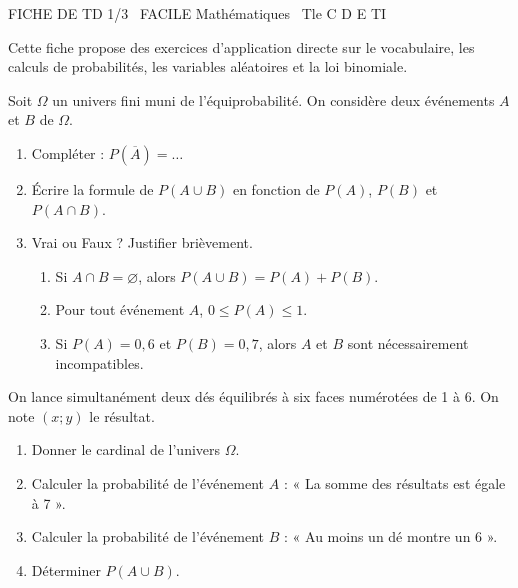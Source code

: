 \documentclass[11pt]{article}
\begin{document}
\begin{tcolorbox}[enhanced,colback=popink,colframe=popink,arc=10pt,boxrule=0pt,left=12pt,right=12pt,top=9pt,bottom=9pt]
{\color{white}\popxbold\small FICHE DE TD 1/3 \textbullet\ FACILE \hfill Mathématiques \textbullet\ Tle C D E TI\par}
\end{tcolorbox}
\vspace{4pt}
Cette fiche propose des exercices d'application directe sur le vocabulaire, les calculs de probabilités, les variables aléatoires et la loi binomiale.

\begin{exercice}
Soit $\Omega$ un univers fini muni de l'équiprobabilité. On considère deux événements $A$ et $B$ de $\Omega$.
\begin{enumerate}
    \item Compléter : $P(\overline{A}) = \dots$
    \item Écrire la formule de $P(A \cup B)$ en fonction de $P(A)$, $P(B)$ et $P(A \cap B)$.
    \item Vrai ou Faux ? Justifier brièvement.
    \begin{enumerate}
        \item Si $A \cap B = \varnothing$, alors $P(A \cup B) = P(A) + P(B)$.
        \item Pour tout événement $A$, $0 \le P(A) \le 1$.
        \item Si $P(A) = 0,6$ et $P(B) = 0,7$, alors $A$ et $B$ sont nécessairement incompatibles.
    \end{enumerate}
\end{enumerate}
\end{exercice}

\begin{exercice}
On lance simultanément deux dés équilibrés à six faces numérotées de 1 à 6. On note $(x;y)$ le résultat.
\begin{enumerate}
    \item Donner le cardinal de l'univers $\Omega$.
    \item Calculer la probabilité de l'événement $A$ : « La somme des résultats est égale à 7 ».
    \item Calculer la probabilité de l'événement $B$ : « Au moins un dé montre un 6 ».
    \item Déterminer $P(A \cup B)$.
\end{enumerate}
\end{exercice}
\end{document}

